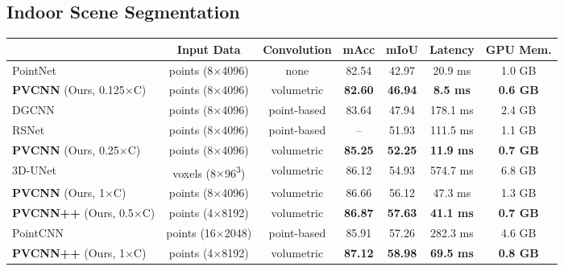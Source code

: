 \documentclass{article}
\def\modelshort{PVCNN\xspace}
\def\modelshortp{PVCNN++\xspace}
\begin{document}
\subsection{Indoor Scene Segmentation}

\begin{table*}[t]
\setlength{\tabcolsep}{5.5pt}
\small\centering
\begin{tabular}{lcccccc}
    \toprule
    & Input Data & Convolution & mAcc & mIoU & Latency & GPU Mem. \\
    \midrule
    PointNet~\cite{Qi:2017vq} & points (8$\times$4096) & none & 82.54 & 42.97 & 20.9 ms & 1.0 GB\\
    \textbf{\modelshort} (Ours, 0.125$\times$C) & points (8$\times$4096) & volumetric & \textbf{82.60} & \textbf{46.94} & \textbf{8.5 ms} & \textbf{0.6 GB}\\
    \midrule
    DGCNN~\cite{Wang:2018dg} & points (8$\times$4096) & point-based & 83.64 & 47.94 & 178.1 ms & 2.4 GB \\
    RSNet~\cite{Huang:2018rs} & points (8$\times$4096) & point-based & -- & 51.93 & 111.5 ms & 1.1 GB \\
    \textbf{\modelshort} (Ours, 0.25$\times$C) & points (8$\times$4096) & volumetric & \textbf{85.25} & \textbf{52.25} & \textbf{11.9 ms} & \textbf{0.7 GB}\\
    \midrule
    3D-UNet~\cite{Cicek:2016un} & voxels (8$\times$96\textsuperscript{3}) & volumetric & 86.12 & 54.93 & 574.7 ms & 6.8 GB \\
    \textbf{\modelshort} (Ours, 1$\times$C) & points (8$\times$4096) & volumetric & 86.66 & 56.12 & 47.3 ms & 1.3 GB \\
    \textbf{\modelshortp} (Ours, 0.5$\times$C) & points (4$\times$8192) & volumetric & \textbf{86.87} & \textbf{57.63} & \textbf{41.1 ms} & \textbf{0.7 GB}\\
    \midrule
    PointCNN~\cite{Li:2018tp} & points (16$\times$2048) & point-based & 85.91 & 57.26 & 282.3 ms & 4.6 GB \\
    \textbf{\modelshortp} (Ours, 1$\times$C) & points (4$\times$8192) & volumetric & \textbf{87.12} & \textbf{58.98} & \textbf{69.5 ms} & \textbf{0.8 GB} \\
    \bottomrule
\end{tabular}
\caption{Results of indoor scene segmentation on S3DIS. On average, our \modelshort and \modelshortp outperform the point-based models with \textbf{8$\times$} measured speedup and \textbf{3$\times$} memory reduction, and outperform the voxel-based baseline with \textbf{14$\times$} measured speedup and \textbf{10$\times$} memory reduction.}

\end{table*}
\end{document}
